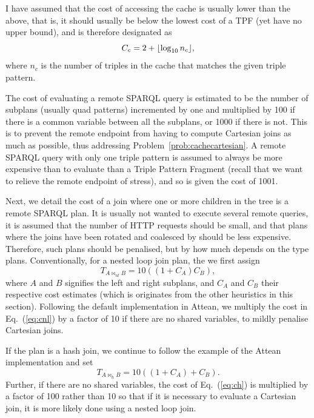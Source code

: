 I have assumed that the cost of accessing the cache is usually
lower than the above, that is, it should usually be below the lowest cost
of a TPF (yet have no upper bound), and is therefore designated as
\begin{equation}
C_c = 2 + \lfloor \log_{10}{n_c} \rfloor , 
\end{equation}
where $n_c$ is the number of triples in the cache that matches the
given triple pattern.

The cost of evaluating a remote SPARQL query is estimated to be the
number of subplans (usually quad patterns) incremented by one and
multiplied by 100 if there is a common variable between all the
subplans, or 1000 if there is not. This is to prevent the remote
endpoint from having to compute Cartesian joins as much as possible,
thus addressing Problem~\ref{prob:cachecartesian}. A
remote SPARQL query with only one triple pattern is assumed to always
be more expensive than to evaluate than a Triple Pattern Fragment
(recall that we want to relieve the remote endpoint of stress), and so
is given the cost of 1001.


Next, we detail the cost of a join where one or more children in the
tree is a remote SPARQL plan. It is usually not wanted to execute
several remote queries, it is assumed that the number of HTTP requests
should be small, and that plans where the joins have been rotated and
coalesced by  should be
less expensive. Therefore, such plans should be penalised, but by how
much depends on the type plans. Conventionally, for a nested loop join
plan, the we first assign 
\begin{equation}\label{eq:cnl}
T_{A \bowtie_{nl} B} = 10 ((1 + C_A) C_B ) ,
\end{equation}
where $A$ and $B$ signifies the left and right subplans, and $C_A$ and
$C_B$ their respective cost estimates (which is originates from the
other heuristics in this section).  Following the default
implementation in Attean, we multiply the cost in Eq.~(\ref{eq:cnl})
by a factor of 10 if there are no shared variables, to mildly penalise
Cartesian joins.

If the plan is a hash join, we continue to follow the example of
the Attean implementation and set
\begin{equation}\label{eq:ch}
T_{A \bowtie_{h} B} = 10 ((1 + C_A) + C_B ) .
\end{equation}
Further, if there are no shared variables, the cost of
Eq.~(\ref{eq:ch}) is multiplied by a factor of 100 rather than 10 so
that if it is necessary to evaluate a Cartesian join, it is more
likely done using a nested loop join.

